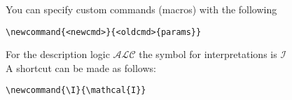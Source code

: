 \documentclass{article}
\begin{document}
You can specify custom commands (macros) with the following
\begin{verbatim}
\newcommand{<newcmd>}{<oldcmd>{params}}
\end{verbatim}

For the description logic $\mathcal{ALC}$ the symbol for interpretations is
$\mathcal{I}$ \\
A shortcut can be made as follows:
\begin{verbatim}
\newcommand{\I}{\mathcal{I}}
\end{verbatim}
\end{document}
